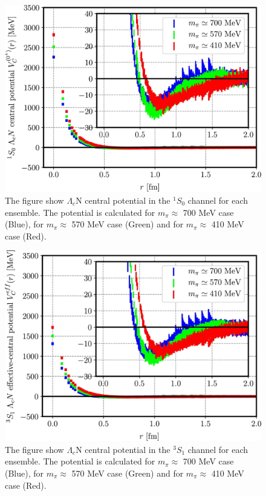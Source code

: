 \documentclass[12pt,a4paper]{book}
\begin{document}
	\begin{figure}
			\centering
			\includegraphics[width=0.8 \linewidth]{pictures/radial_potential_1s.jpg}
			\caption{ The figure show $\Lambda_c$N central potential in the $ ^{1}S_0$ channel for each ensemble. The potential is calculated for $m_\pi \approx$ 700 MeV case (Blue), for $m_\pi \approx$ 570 MeV case (Green) and for $m_\pi \approx$ 410 MeV case (Red).}
			\label{fig:radial_potential_1s}
	\end{figure}
	\begin{figure}
			\centering
			\includegraphics[width=0.8 \linewidth]{pictures/radial_potential_3s.jpg}
			\caption{ The figure show $\Lambda_c$N central potential in the $ ^{3}S_1$ channel for each ensemble. The potential is calculated for $m_\pi \approx$ 700 MeV case (Blue), for $m_\pi \approx$  570 MeV case (Green) and for $m_\pi \approx$  410 MeV case (Red).}
			\label{fig:radial_potential_3s}
	\end{figure}
	
\end{document}
